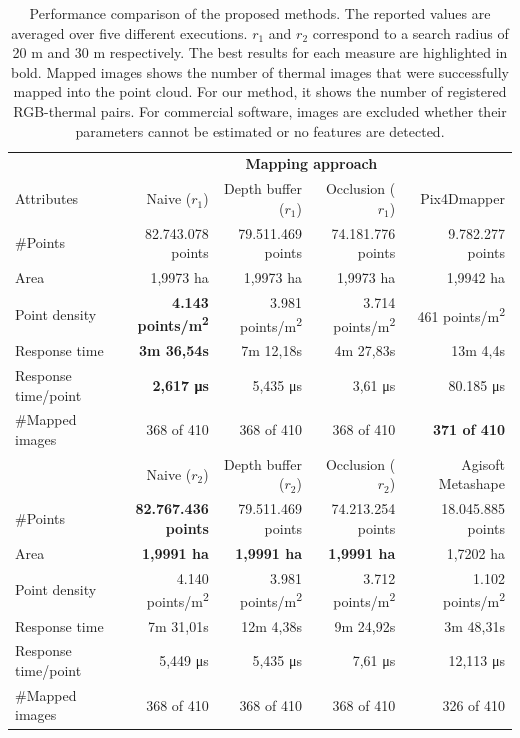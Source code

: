 \renewcommand{\arraystretch}{1.2}
    \begin{table}
    \caption{Performance comparison of the proposed methods. The reported values are averaged over five different executions. $r_1$ and $r_2$ correspond to a search radius of 20 \si{\meter} and 30 \si{\meter} respectively. The best results for each measure are highlighted in bold. Mapped images shows the number of thermal images that were successfully mapped into the point cloud. For our method, it shows the number of registered RGB-thermal pairs. For commercial software, images are excluded whether their parameters cannot be estimated or no features are detected. }
    \label{table:thermal_point_cloud_approaches}
    \begin{tabular}{@{}lrrrr@{} }
    \toprule
    & \multicolumn{4}{c}{\textbf{Mapping approach}} \\
    \cmidrule{2-5}
    Attributes & Naive ($r_1$) & Depth buffer ($r_1$) & Occlusion ($r_1$) & Pix4Dmapper\\
    \midrule
    \#Points & 82.743.078 points & 79.511.469 points & 74.181.776 points & 9.782.277 points\\
    Area & 1,9973 ha & 1,9973 ha & 1,9973 ha & 1,9942 ha\\
    Point density & \textbf{4.143 points/\si{\metre\squared}} & 3.981 points/\si{\metre\squared} & 3.714 points/\si{\metre\squared} & 461 points/\si{\metre\squared}\\
    Response time & \textbf{3m 36,54s} & 7m 12,18s & 4m 27,83s & 13m 4,4s\\
    Response time/point & \textbf{2,617 \si{\micro\second}} & 5,435 \si{\micro\second} & 3,61 \si{\micro\second} & 80.185 \si{\micro\second}\\
    \#Mapped images & 368 of 410 & 368 of 410 & 368 of 410 & \textbf{371 of 410}\\[1mm]
    \cmidrule{2-5}
     & Naive ($r_2$) & Depth buffer ($r_2$) & Occlusion ($r_2$) & Agisoft Metashape\\
    \midrule
    \#Points & \textbf{82.767.436 points} & 79.511.469 points & 74.213.254 points & 18.045.885 points \\
    Area & \textbf{1,9991 ha} & \textbf{1,9991 ha} & \textbf{1,9991 ha} & 1,7202 ha \\
    Point density & 4.140 points/\si{\metre\squared} & 3.981 points/\si{\metre\squared} & 3.712 points/\si{\metre\squared} & 1.102 points/\si{\metre\squared} \\
    Response time & 7m 31,01s & 12m 4,38s & 9m 24,92s & 3m 48,31s \\
    Response time/point & 5,449 \si{\micro\second} & 5,435 \si{\micro\second} & 7,61 \si{\micro\second} & 12,113 \si{\micro\second} \\
    \#Mapped images & 368 of 410 & 368 of 410 & 368 of 410 & 326 of 410\\
    \bottomrule
    \end{tabular}
\end{table}
\renewcommand{\arraystretch}{1}

